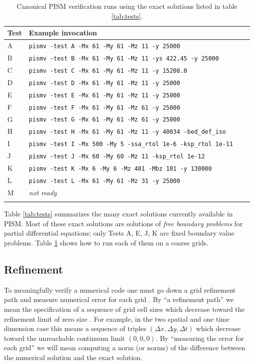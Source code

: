 \documentclass[11pt,final]{amsart}
\begin{document}
\begin{table}[ht]
\caption{Canonical PISM verification runs using the exact solutions listed in table \ref{tab:tests}.}\label{tab:tests_exec}
\small
\begin{tabular}{@{}llll}\hline
\textbf{Test} & \textbf{Example invocation}  \\ \hline
A & \verb|pismv -test A -Mx 61 -My 61 -Mz 11 -y 25000| \\
B & \verb|pismv -test B -Mx 61 -My 61 -Mz 11 -ys 422.45 -y 25000|  \\
C & \verb|pismv -test C -Mx 61 -My 61 -Mz 11 -y 15208.0|  \\
D & \verb|pismv -test D -Mx 61 -My 61 -Mz 11 -y 25000|  \\
E & \verb|pismv -test E -Mx 61 -My 61 -Mz 11 -y 25000|  \\
F & \verb|pismv -test F -Mx 61 -My 61 -Mz 61 -y 25000|  \\
G & \verb|pismv -test G -Mx 61 -My 61 -Mz 61 -y 25000|  \\
H & \verb|pismv -test H -Mx 61 -My 61 -Mz 11 -y 40034 -bed_def_iso| \\
I & \verb|pismv -test I -Mx 500 -My 5 -ssa_rtol 1e-6 -ksp_rtol 1e-11| \\
J & \verb|pismv -test J -Mx 60 -My 60 -Mz 11 -ksp_rtol 1e-12| \\
K & \verb|pismv -test K -Mx 6 -My 6 -Mz 401 -Mbz 101 -y 130000| \\
L & \verb|pismv -test L -Mx 61 -My 61 -Mz 31 -y 25000| \\
M & \emph{not ready} \\
\hline
\normalsize
\end{tabular}
\end{table}

Table \ref{tab:tests} summarizes the many exact solutions currently available in PISM.  Most of these exact solutions are solutions of \emph{free boundary problems} for partial differential equations; only Tests A, E, J, K are fixed boundary value problems.  Table \ref{tab:tests_exec} shows how to run each of them on a coarse grids.

\subsection{Refinement}  To meaningfully verify a numerical code one must go down a grid refinement path and measure numerical error for each grid \cite{Roache}.  By ``a refinement path'' we mean the specification of a sequence of grid cell sizes which decrease toward the refinement limit of zero size \cite{MortonMayers}.  For example, in the two spatial and one time dimension case this means a sequence of triples $(\Delta x,\Delta y,\Delta t)$ which decrease toward the unreachable continuum limit $(0,0,0)$.  By ``measuring the error for each grid'' we will mean computing a norm (or norms) of the difference between the numerical solution and the exact solution.
\end{document}
